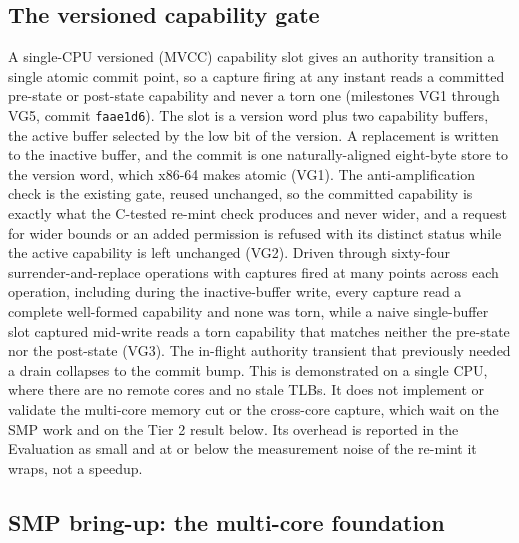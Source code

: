 \documentclass[10pt,twocolumn]{article}
\begin{document}
\subsection{The versioned capability gate}

A single-CPU versioned (MVCC) capability slot gives an authority transition a
single atomic commit point, so a capture firing at any instant reads a committed
pre-state or post-state capability and never a torn one (milestones VG1 through
VG5, commit \texttt{faae1d6}). The slot is a version word plus two capability
buffers, the active buffer selected by the low bit of the version. A replacement
is written to the inactive buffer, and the commit is one naturally-aligned
eight-byte store to the version word, which x86-64 makes atomic (VG1). The
anti-amplification check is the existing gate, reused unchanged, so the committed
capability is exactly what the C-tested re-mint check produces and never wider, and a
request for wider bounds or an added permission is refused with its distinct
status while the active capability is left unchanged (VG2). Driven through
sixty-four surrender-and-replace operations with captures fired at many points
across each operation, including during the inactive-buffer write, every capture
read a complete well-formed capability and none was torn, while a naive
single-buffer slot captured mid-write reads a torn capability that matches neither
the pre-state nor the post-state (VG3). The in-flight authority transient that
previously needed a drain collapses to the commit bump. This is demonstrated on a
single CPU, where there are no remote cores and no stale TLBs. It does not
implement or validate the multi-core memory cut or the cross-core capture, which
wait on the SMP work and on the Tier 2 result below. Its overhead is reported in
the Evaluation as small and at or below the measurement noise of the re-mint it
wraps, not a speedup.

\subsection{SMP bring-up: the multi-core foundation}
\end{document}
